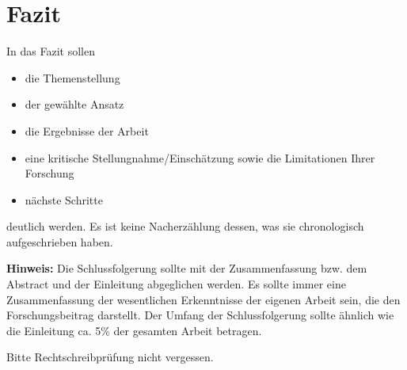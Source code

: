 \section{Fazit} \label{Fazit}

In das Fazit sollen
\begin{itemize}
\item die Themenstellung
\item der gewählte Ansatz
\item die Ergebnisse der Arbeit
\item eine kritische Stellungnahme/Einschätzung sowie die Limitationen Ihrer Forschung
\item nächste Schritte
\end{itemize}
deutlich werden.
Es ist keine Nacherzählung dessen, was sie chronologisch aufgeschrieben haben.

\textbf{Hinweis:}
Die Schlussfolgerung sollte mit der Zusammenfassung bzw. dem Abstract und der Einleitung abgeglichen werden. Es sollte immer eine Zusammenfassung der wesentlichen Erkenntnisse der eigenen Arbeit sein, die den Forschungsbeitrag darstellt. Der Umfang der Schlussfolgerung sollte ähnlich wie die Einleitung ca. 5\% der gesamten Arbeit betragen.


Bitte Rechtschreibprüfung nicht vergessen.